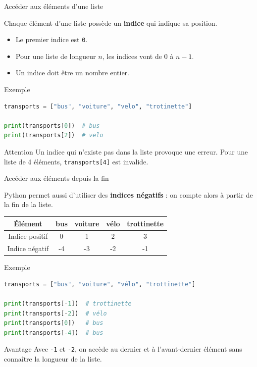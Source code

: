 \documentclass[10pt]{beamer}
\begin{document}
\begin{frame}[fragile]{Accéder aux éléments d'une liste}

Chaque élément d'une liste possède un \textbf{indice} qui indique sa position.

\begin{itemize}
    \item Le premier indice est \texttt{0}.
    \item Pour une liste de longueur $n$, les indices vont de $0$ à $n-1$.
    \item Un indice doit être un nombre entier.
\end{itemize}

\begin{exampleblock}{Exemple}
\begin{lstlisting}[language=Python]
transports = ["bus", "voiture", "velo", "trotinette"]

print(transports[0])  # bus
print(transports[2])  # velo
\end{lstlisting}
\end{exampleblock}

\begin{alertblock}{Attention}
Un indice qui n'existe pas dans la liste provoque une erreur.
Pour une liste de 4 éléments, \texttt{transports[4]} est invalide.
\end{alertblock}

\end{frame}


\begin{frame}[fragile]{Accéder aux éléments depuis la fin}

Python permet aussi d'utiliser des \textbf{indices négatifs} :
on compte alors à partir de la fin de la liste.

\vspace{0.3cm}

\begin{center}
\begin{tabular}{c|c|c|c|c}
Élément & bus & voiture & vélo & trottinette \\ \hline
Indice positif & 0 & 1 & 2 & 3 \\ \hline
Indice négatif & -4 & -3 & -2 & -1
\end{tabular}
\end{center}

\begin{exampleblock}{Exemple}
\begin{lstlisting}[language=Python]
transports = ["bus", "voiture", "vélo", "trottinette"]

print(transports[-1])  # trottinette
print(transports[-2])  # vélo
print(transports[0])   # bus
print(transports[-4])  # bus
\end{lstlisting}
\end{exampleblock}

\begin{block}{Avantage}
Avec \texttt{-1} et \texttt{-2}, on accède au dernier et à
l'avant-dernier élément sans connaître la longueur de la liste.
\end{block}

\end{frame}
\end{document}
